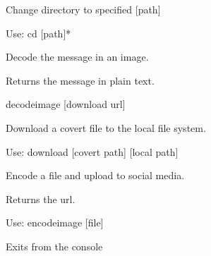 \documentclass[letterpaper,10pt,english]{sphinxmanual}
\begin{document}
\begin{fulllineitems}
\begin{fulllineitems}
\end{fulllineitems}


\begin{fulllineitems}
\label{main:main.Console.do_cd}
Change directory to specified {[}path{]}

Use: cd {[}path{]}*

\end{fulllineitems}


\begin{fulllineitems}
\label{main:main.Console.do_decodeimage}
Decode the message in an image.

Returns the message in plain text.

decodeimage {[}download url{]}

\end{fulllineitems}


\begin{fulllineitems}
\label{main:main.Console.do_download}
Download a covert file to the local file system.

Use: download {[}covert path{]} {[}local path{]}

\end{fulllineitems}


\begin{fulllineitems}
\label{main:main.Console.do_encodeimage}
Encode a file and upload to social media.

Returns the url.

Use: encodeimage {[}file{]}

\end{fulllineitems}


\begin{fulllineitems}
\label{main:main.Console.do_exit}
Exits from the console


\end{fulllineitems}
\end{fulllineitems}
\end{document}
